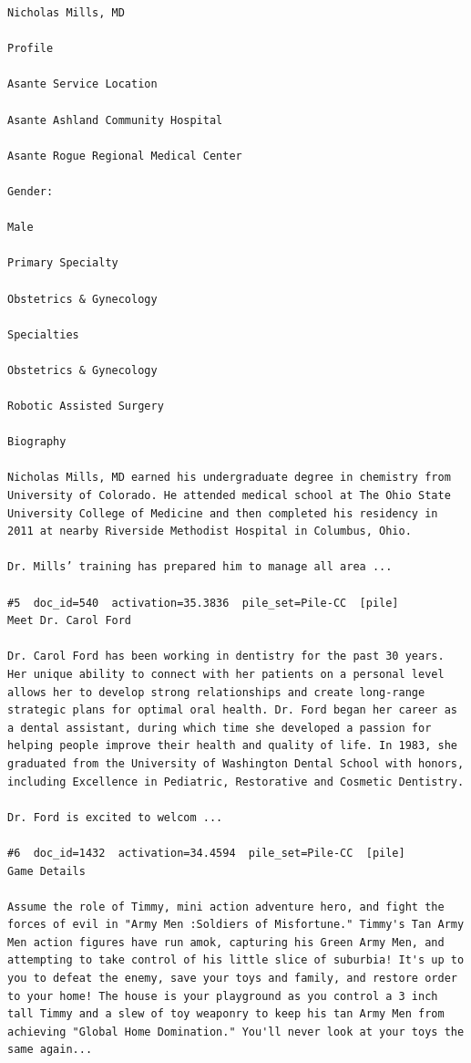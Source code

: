 \begin{verbatim}
Nicholas Mills, MD

Profile

Asante Service Location

Asante Ashland Community Hospital

Asante Rogue Regional Medical Center

Gender:

Male

Primary Specialty

Obstetrics & Gynecology

Specialties

Obstetrics & Gynecology

Robotic Assisted Surgery

Biography

Nicholas Mills, MD earned his undergraduate degree in chemistry from University of Colorado. He attended medical school at The Ohio State University College of Medicine and then completed his residency in 2011 at nearby Riverside Methodist Hospital in Columbus, Ohio.

Dr. Mills’ training has prepared him to manage all area ...

#5  doc_id=540  activation=35.3836  pile_set=Pile-CC  [pile]
Meet Dr. Carol Ford

Dr. Carol Ford has been working in dentistry for the past 30 years. Her unique ability to connect with her patients on a personal level allows her to develop strong relationships and create long-range strategic plans for optimal oral health. Dr. Ford began her career as a dental assistant, during which time she developed a passion for helping people improve their health and quality of life. In 1983, she graduated from the University of Washington Dental School with honors, including Excellence in Pediatric, Restorative and Cosmetic Dentistry.

Dr. Ford is excited to welcom ...

#6  doc_id=1432  activation=34.4594  pile_set=Pile-CC  [pile]
Game Details

Assume the role of Timmy, mini action adventure hero, and fight the forces of evil in "Army Men :Soldiers of Misfortune." Timmy's Tan Army Men action figures have run amok, capturing his Green Army Men, and attempting to take control of his little slice of suburbia! It's up to you to defeat the enemy, save your toys and family, and restore order to your home! The house is your playground as you control a 3 inch tall Timmy and a slew of toy weaponry to keep his tan Army Men from achieving "Global Home Domination." You'll never look at your toys the same again...


\end{verbatim}

